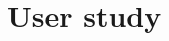 \documentclass[review,journal]{vgtc}         %
\begin{document}
%
%

\section{User study}
\end{document}
